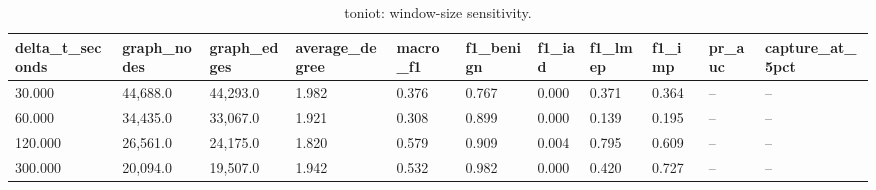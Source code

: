 \begin{table}[t]
\centering
\caption{toniot: window-size sensitivity.}
\label{tab:toniot_window_sensitivity}
\begin{tabular}{lllllllllll}
\toprule
delta\_t\_seconds & graph\_nodes & graph\_edges & average\_degree & macro\_f1 & f1\_benign & f1\_iad & f1\_lmep & f1\_imp & pr\_auc & capture\_at\_5pct \\
\midrule
30.000 & 44,688.0 & 44,293.0 & 1.982 & 0.376 & 0.767 & 0.000 & 0.371 & 0.364 & -- & -- \\
60.000 & 34,435.0 & 33,067.0 & 1.921 & 0.308 & 0.899 & 0.000 & 0.139 & 0.195 & -- & -- \\
120.000 & 26,561.0 & 24,175.0 & 1.820 & 0.579 & 0.909 & 0.004 & 0.795 & 0.609 & -- & -- \\
300.000 & 20,094.0 & 19,507.0 & 1.942 & 0.532 & 0.982 & 0.000 & 0.420 & 0.727 & -- & -- \\
\bottomrule
\end{tabular}
\end{table}
